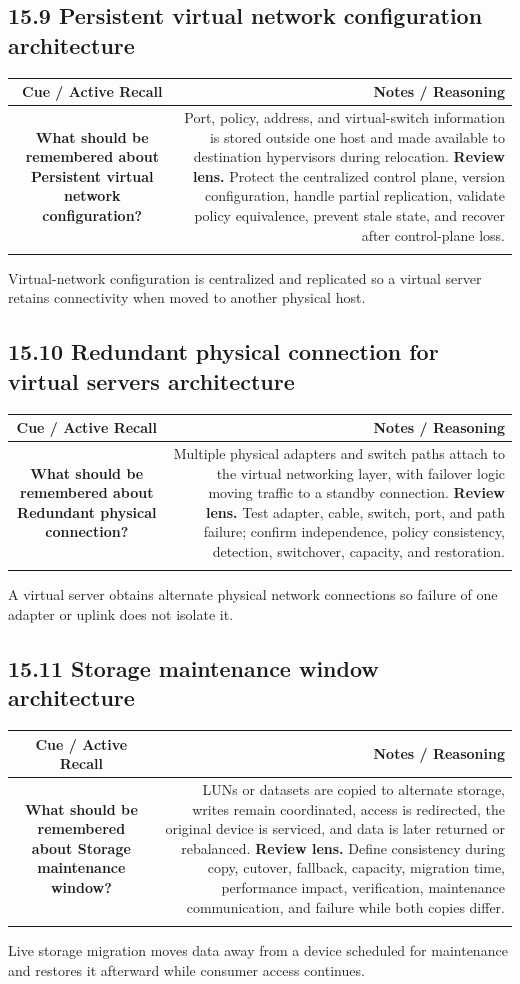 \documentclass[11pt]{article}
\newcommand{\CornellHeader}{\rowcolor{Navy}\color{white}\bfseries Cue / Active Recall & \color{white}\bfseries Notes / Reasoning \\\endhead}
\newcommand{\CornellRow}[2]{\cellcolor{CueGray}\textbf{#1} & #2 \\\addlinespace[3pt]}
\begin{document}
\subsection{15.9 Persistent virtual network configuration architecture}
\begin{longtable}{@{}C N@{}}
\CornellHeader
\CornellRow{What should be remembered about Persistent virtual network configuration?}{Port, policy, address, and virtual-switch information is stored outside one host and made available to destination hypervisors during relocation. \textbf{Review lens.} Protect the centralized control plane, version configuration, handle partial replication, validate policy equivalence, prevent stale state, and recover after control-plane loss.}
\end{longtable}
\begin{sectionsummarybox}
Virtual-network configuration is centralized and replicated so a virtual server retains connectivity when moved to another physical host.
\end{sectionsummarybox}
\subsection{15.10 Redundant physical connection for virtual servers architecture}
\begin{longtable}{@{}C N@{}}
\CornellHeader
\CornellRow{What should be remembered about Redundant physical connection?}{Multiple physical adapters and switch paths attach to the virtual networking layer, with failover logic moving traffic to a standby connection. \textbf{Review lens.} Test adapter, cable, switch, port, and path failure; confirm independence, policy consistency, detection, switchover, capacity, and restoration.}
\end{longtable}
\begin{sectionsummarybox}
A virtual server obtains alternate physical network connections so failure of one adapter or uplink does not isolate it.
\end{sectionsummarybox}
\subsection{15.11 Storage maintenance window architecture}
\begin{longtable}{@{}C N@{}}
\CornellHeader
\CornellRow{What should be remembered about Storage maintenance window?}{LUNs or datasets are copied to alternate storage, writes remain coordinated, access is redirected, the original device is serviced, and data is later returned or rebalanced. \textbf{Review lens.} Define consistency during copy, cutover, fallback, capacity, migration time, performance impact, verification, maintenance communication, and failure while both copies differ.}
\end{longtable}
\begin{sectionsummarybox}
Live storage migration moves data away from a device scheduled for maintenance and restores it afterward while consumer access continues.
\end{sectionsummarybox}
\end{document}
